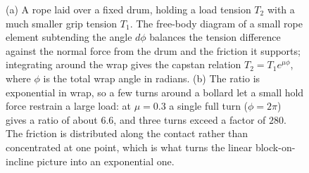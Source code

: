 \begin{figure}[htbp]
\begin{tikzpicture}[
  rope/.style={draw=engblue, line width=1.6pt},
  frc/.style={draw=engred, -{Stealth}, very thick},
  scale=1.0,
]
\end{tikzpicture}
\caption[A rope over a drum and the capstan tension ratio]{(a) A rope laid
over a fixed drum, holding a load tension $T_2$ with a much smaller grip
tension $T_1$. The free-body diagram of a small rope element subtending the
angle $d\phi$ balances the tension difference against the normal force from
the drum and the friction it supports; integrating around the wrap gives the
capstan relation $T_2 = T_1 e^{\mu\phi}$, where $\phi$ is the total wrap
angle in radians. (b) The ratio is exponential in wrap, so a few turns
around a bollard let a small hold force restrain a large load: at $\mu = 0.3$
a single full turn ($\phi = 2\pi$) gives a ratio of about $6.6$, and three
turns exceed a factor of $280$. The friction is distributed along the
contact rather than concentrated at one point, which is what turns the
linear block-on-incline picture into an exponential one.}
\label{fig:vol03ch01:capstan}
\end{figure}
